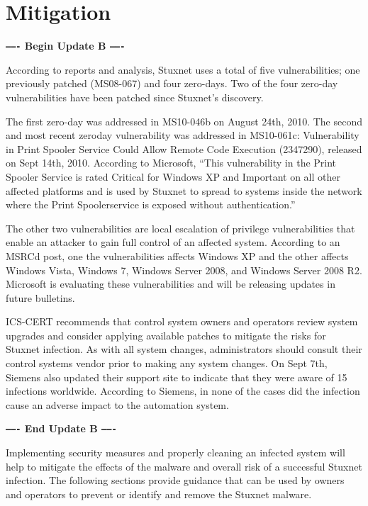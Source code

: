 \documentclass[10pt,twoside,openleft]{memoir}
\begin{document}
\section{Mitigation}

\textbf{\texttt{-------} Begin Update B \texttt{-------}}

\vskip 0.1in

\noindent According to reports and analysis, Stuxnet uses a total of five vulnerabilities; one previously patched (MS08-067) and four zero-days. Two of the four zero-day vulnerabilities have been patched since Stuxnet’s discovery.

The first zero-day was addressed in MS10-046b on August 24th, 2010. The second and most recent zeroday vulnerability was addressed in MS10-061c: Vulnerability in Print Spooler Service Could Allow Remote Code Execution (2347290), released on Sept 14th, 2010. According to Microsoft, ``This vulnerability in the Print Spooler Service is rated Critical for Windows XP and Important on all other affected platforms and is used by Stuxnet to spread to systems inside the network where the Print Spoolerservice is exposed without authentication.''

The other two vulnerabilities are local escalation of privilege vulnerabilities that enable an attacker to gain full control of an affected system. According to an MSRCd post, one the vulnerabilities affects Windows XP and the other affects Windows Vista, Windows 7, Windows Server 2008, and Windows Server 2008 R2. Microsoft is evaluating these vulnerabilities and will be releasing updates in future bulletins.

ICS-CERT recommends that control system owners and operators review system upgrades and consider applying available patches to mitigate the risks for Stuxnet infection. As with all system changes, administrators should consult their control systems vendor prior to making any system changes. On Sept 7th, Siemens also updated their support site to indicate that they were aware of 15 infections worldwide. According to Siemens, in none of the cases did the infection cause an adverse impact to the automation system.

\vskip 0.2in

\noindent \textbf{\texttt{-------} End Update B \texttt{-------}}

\vskip 0.2in

\noindent Implementing security measures and properly cleaning an infected system will help to mitigate the effects of the malware and overall risk of a successful Stuxnet infection. The following sections provide guidance that can be used by owners and operators to prevent or identify and remove the Stuxnet malware.
\end{document}
